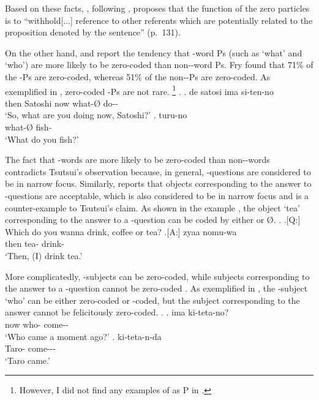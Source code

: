 Based on these facts,
, following ,
proposes that the function of the zero particles is to
``withhold[...] reference to other referents 
which are potentially related to the proposition denoted by the sentence'' (p.~131).


On the other hand,
 and  report the tendency that
-word Ps (such as  `what' and  `who') are
more likely to be zero-coded than non--word Ps.
Fry found that 71\% of the -Ps are zero-coded,
whereas 51\% of the non--Ps are zero-coded.
As exemplified in \Next,
zero-coded -Ps are not rare.%
 \footnote{
 However, I did not find any examples of  as P in
 .
 }
%
\ex.
 \ag. de satosi ima  si-ten-no \\
      then Satoshi now what-{\O} do-- \\
      `So, what are you doing now, Satoshi?'
 \bg.  turu-no \\
      what-{\O} fish- \\
      `What do you fish?'

The fact that -words are more likely to be zero-coded than non--words contradicts Tsutsui's observation because,
in general, -questions are considered to be in narrow focus.
Similarly,  reports that
objects corresponding to the answer to -questions are acceptable,
which is also considered to be in narrow focus and
is a counter-example to Tsutsui's claim.
As shown in the example \Next[A],
the object  `tea' corresponding to the answer to a -question can be coded by either  or {\O}.
%
\ex.
 \a.[Q:] Which do you wanna drink, coffee or tea?
 \bg.[A:] zyaa  nomu-wa \\
          then tea- drink- \\
          `Then, (I) drink tea.'
          \hfill{\cite[291]{niwa06}}

More complicatedly,
-subjects can be zero-coded,
while subjects corresponding to the answer to a -question cannot be zero-coded \cite{niwa06}.
As exemplified in \Next,
the -subject  `who' can be either zero-coded or -coded,
but the subject corresponding to the answer cannot be felicitously zero-coded.
%
\ex.
 \ag. ima  ki-teta-no? \\
       now who- come-- \\
       `Who came a moment ago?'
 \bg.  ki-teta-n-da \\
       Taro- come--- \\
       `Taro came.'
          \hfill{\cite[291]{niwa06}}

